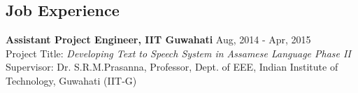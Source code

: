\documentclass[margin, centered]{res}
\begin{document}
\begin{resume}
\section{Job Experience}
\textbf{Assistant Project Engineer, IIT Guwahati} \hfill Aug, 2014 - Apr, 2015 \\
Project Title: \textit{Developing Text to Speech System in Assamese Language Phase II} \\
Supervisor: Dr. S.R.M.Prasanna, Professor, Dept. of EEE, Indian Institute of Technology, Guwahati (IIT-G)

\end{resume}
\end{document}
